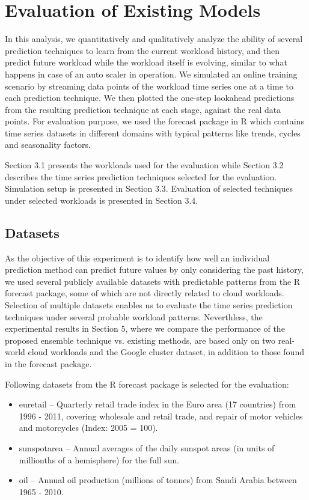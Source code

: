 \section{Evaluation of Existing Models}

In this analysis, we quantitatively and qualitatively analyze the ability of several prediction techniques to learn from the current workload history, and then predict future workload while the workload itself is evolving, similar to what happens in case of an auto scaler in operation. We simulated an online training scenario by streaming data points of the workload time series one at a time to each prediction technique. We then plotted the one-step lookahead predictions from the resulting prediction technique at each stage, against the real data points. For evaluation purpose, we used the forecast package in R \cite{forecastPackage} which contains time series datasets in different domains with typical patterns like trends, cycles and seasonality factors.

Section 3.1 presents the workloads used for the evaluation while Section 3.2 describes the time series prediction techniques selected for the evaluation. Simulation setup is presented in Section 3.3. Evaluation of selected techniques under selected workloads is presented in Section 3.4.

\subsection{Datasets}
As the objective of this experiment is to identify how well an individual prediction method can predict future values by only considering the past history, we used several publicly available datasets with predictable patterns from the R forecast package, some of which are not directly related to cloud workloads. Selection of multiple datasets enables us to evaluate the time series prediction techniques under several probable workload patterns. Neverthless, the experimental results in Section 5, where we compare the performance of the proposed ensemble technique vs. existing methods, are based only on two real-world cloud workloads and the Google cluster dataset, in addition to those found in the forecast package.

Following datasets from the R forecast package is selected for the evaluation:
\begin{itemize}
\item euretail -- Quarterly retail trade index in the Euro area (17 countries) from 1996 - 2011, covering wholesale and retail trade, and repair of motor vehicles and motorcycles (Index: 2005 = 100).
\item sunspotarea -- Annual averages of the daily sunspot areas (in units of millionths of a hemisphere) for the full sun.
\item oil -- Annual oil production (millions of tonnes) from Saudi Arabia between 1965 - 2010.
\end{itemize}

